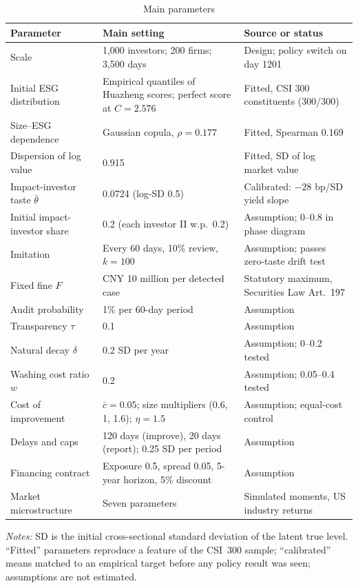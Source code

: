 \documentclass[11pt]{article}
\begin{document}
\begin{table}[t]
\centering
\small
\begin{threeparttable}
\caption{Main parameters}
\label{tab:parameters}
\begin{tabular}{@{}p{4.1cm}p{4.6cm}p{5.6cm}@{}}
\toprule
Parameter & Main setting & Source or status \\
\midrule
Scale & 1,000 investors; 200 firms; 3,500 days & Design; policy switch on day 1201 \\
Initial ESG distribution & Empirical quantiles of Huazheng scores; perfect score at $C=2.576$ & Fitted, CSI 300 constituents (300/300) \\
Size--ESG dependence & Gaussian copula, $\rho = 0.177$ & Fitted, Spearman 0.169 \\
Dispersion of log value & 0.915 & Fitted, SD of log market value \\
Impact-investor taste $\bar\theta$ & 0.0724 (log-SD 0.5) & Calibrated: $-28$ bp/SD yield slope \\
Initial impact-investor share & 0.2 (each investor II w.p.\ 0.2) & Assumption; 0--0.8 in phase diagram \\
Imitation & Every 60 days, 10\% review, $k=100$ & Assumption; passes zero-taste drift test \\
Fixed fine $F$ & CNY 10 million per detected case & Statutory maximum, Securities Law Art.\ 197 \\
Audit probability & 1\% per 60-day period & Assumption \\
Transparency $\tau$ & 0.1 & Assumption \\
Natural decay $\delta$ & 0.2 SD per year & Assumption; 0--0.2 tested \\
Washing cost ratio $w$ & 0.2 & Assumption; 0.05--0.4 tested \\
Cost of improvement & $\bar c = 0.05$; size multipliers (0.6, 1, 1.6); $\eta = 1.5$ & Assumption; equal-cost control \\
Delays and caps & 120 days (improve), 20 days (report); 0.25 SD per period & Assumption \\
Financing contract & Exposure 0.5, spread 0.05, 5-year horizon, 5\% discount & Assumption \\
Market microstructure & Seven parameters & Simulated moments, US industry returns \\
\bottomrule
\end{tabular}
\begin{tablenotes}[flushleft]\footnotesize
\item \textit{Notes:} SD is the initial cross-sectional standard deviation of the latent true level. ``Fitted'' parameters reproduce a feature of the CSI~300 sample; ``calibrated'' means matched to an empirical target before any policy result was seen; assumptions are not estimated.
\end{tablenotes}
\end{threeparttable}
\end{table}
\end{document}
